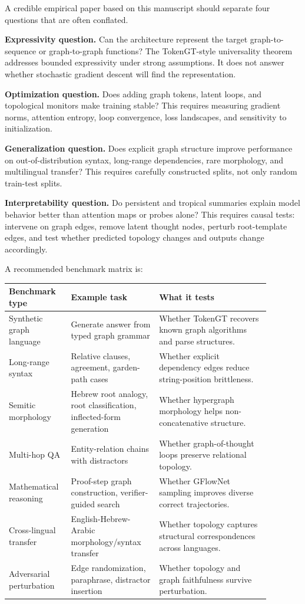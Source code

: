 \documentclass[11pt]{article}
\newcommand{\1}{\mathbf{1}}
\begin{document}
A credible empirical paper based on this manuscript should separate four questions that are often conflated.

\textbf{Expressivity question.} Can the architecture represent the target graph-to-sequence or graph-to-graph functions? The TokenGT-style universality theorem addresses bounded expressivity under strong assumptions. It does not answer whether stochastic gradient descent will find the representation.

\textbf{Optimization question.} Does adding graph tokens, latent loops, and topological monitors make training stable? This requires measuring gradient norms, attention entropy, loop convergence, loss landscapes, and sensitivity to initialization.

\textbf{Generalization question.} Does explicit graph structure improve performance on out-of-distribution syntax, long-range dependencies, rare morphology, and multilingual transfer? This requires carefully constructed splits, not only random train-test splits.

\textbf{Interpretability question.} Do persistent and tropical summaries explain model behavior better than attention maps or probes alone? This requires causal tests: intervene on graph edges, remove latent thought nodes, perturb root-template edges, and test whether predicted topology changes and outputs change accordingly.

A recommended benchmark matrix is:

\begin{longtable}{p{0.18\linewidth}p{0.31\linewidth}p{0.39\linewidth}}
\toprule
Benchmark type & Example task & What it tests \\
\midrule
Synthetic graph language & Generate answer from typed graph grammar & Whether TokenGT recovers known graph algorithms and parse structures. \\
Long-range syntax & Relative clauses, agreement, garden-path cases & Whether explicit dependency edges reduce string-position brittleness. \\
Semitic morphology & Hebrew root analogy, root classification, inflected-form generation & Whether hypergraph morphology helps non-concatenative structure. \\
Multi-hop QA & Entity-relation chains with distractors & Whether graph-of-thought loops preserve relational topology. \\
Mathematical reasoning & Proof-step graph construction, verifier-guided search & Whether GFlowNet sampling improves diverse correct trajectories. \\
Cross-lingual transfer & English-Hebrew-Arabic morphology/syntax transfer & Whether topology captures structural correspondences across languages. \\
Adversarial perturbation & Edge randomization, paraphrase, distractor insertion & Whether topology and graph faithfulness survive perturbation. \\
\bottomrule
\end{longtable}
\end{document}
